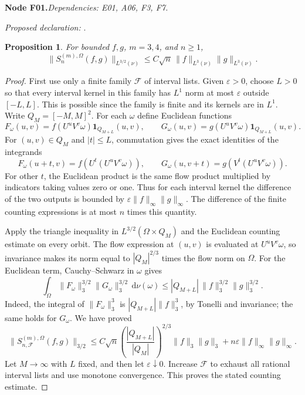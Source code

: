\documentclass[11pt]{article}
\newtheorem{proposition}[theorem]{Proposition}
\theoremstyle{remark}\newtheorem{remark}[theorem]{Remark}
\newcommand{\dd}{\,\mathrm d}\newcommand{\tr}{\operatorname{tr}}
\newcommand{\one}{\mathbf1}
\newcommand{\bpnode}[3]{\par\Needspace{5\baselineskip}\noindent\textbf{Node #1.}\quad\textit{Dependencies: #2.}\par\noindent\textit{Proposed declaration:} \texttt{\detokenize{#3}}.\par\smallskip}
\begin{document}
\bpnode{F01}{E01, A06, F3, F7}{flow_counting_transference}
\begin{proposition}\label{prop:transfer}
For bounded $f,g$, $m=3,4$, and $n\geq1$,
\[
 \|S_n^{(m),\Omega}(f,g)\|_{L^{3/2}(\nu)}
 \leq C\sqrt n\,\|f\|_{L^3(\nu)}\|g\|_{L^3(\nu)}.
\]
\end{proposition}
\begin{proof}
First use only a finite family $\mathcal F$ of interval lists. Given $\varepsilon>0$, choose $L>0$ so that every interval kernel in this family has $L^1$ norm at most $\varepsilon$ outside $[-L,L]$. This is possible since the family is finite and its kernels are in $L^1$. Write $Q_M=[-M,M]^2$. For each $\omega$ define Euclidean functions
\[
 F_\omega(u,v)=f(U^uV^v\omega)\one_{Q_{M+L}}(u,v),\qquad
 G_\omega(u,v)=g(U^uV^v\omega)\one_{Q_{M+L}}(u,v).
\]
For $(u,v)\in Q_M$ and $|t|\leq L$, commutation gives the exact identities of the integrands
\[
 F_\omega(u+t,v)=f(U^t(U^uV^v\omega)),\qquad
 G_\omega(u,v+t)=g(V^t(U^uV^v\omega)).
\]
For other $t$, the Euclidean product is the same flow product multiplied by indicators taking values zero or one. Thus for each interval kernel the difference of the two outputs is bounded by $\varepsilon\|f\|_\infty\|g\|_\infty$. The difference of the finite counting expressions is at most $n$ times this quantity.

Apply the triangle inequality in $L^{3/2}(\Omega\times Q_M)$ and the Euclidean counting estimate on every orbit. The flow expression at $(u,v)$ is evaluated at $U^uV^v\omega$, so invariance makes its norm equal to $|Q_M|^{2/3}$ times the flow norm on $\Omega$. For the Euclidean term, Cauchy--Schwarz in $\omega$ gives
\[
 \int_\Omega\|F_\omega\|_3^{3/2}\|G_\omega\|_3^{3/2}\dd\nu(\omega)
 \leq |Q_{M+L}|\,\|f\|_3^{3/2}\|g\|_3^{3/2}.
\]
Indeed, the integral of $\|F_\omega\|_3^3$ is $|Q_{M+L}|\|f\|_3^3$, by Tonelli and invariance; the same holds for $G_\omega$. We have proved
\[
 \|S_{n,\mathcal F}^{(m),\Omega}(f,g)\|_{3/2}
 \leq C\sqrt n\left(\frac{|Q_{M+L}|}{|Q_M|}\right)^{2/3}\|f\|_3\|g\|_3
       +n\varepsilon\|f\|_\infty\|g\|_\infty.
\]
Let $M\to\infty$ with $L$ fixed, and then let $\varepsilon\downarrow0$. Increase $\mathcal F$ to exhaust all rational interval lists and use monotone convergence. This proves the stated counting estimate.
\end{proof}
\end{document}
